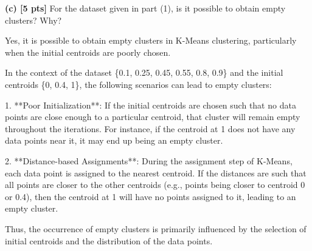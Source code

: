 \textbf{(c) [5 pts]} For the dataset given in part (1), is it possible to obtain empty clusters? Why?

Yes, it is possible to obtain empty clusters in K-Means clustering, particularly when the initial centroids are poorly chosen. 

In the context of the dataset \{0.1, 0.25, 0.45, 0.55, 0.8, 0.9\} and the initial centroids \{0, 0.4, 1\}, the following scenarios can lead to empty clusters:

1. **Poor Initialization**: If the initial centroids are chosen such that no data points are close enough to a particular centroid, that cluster will remain empty throughout the iterations. For instance, if the centroid at 1 does not have any data points near it, it may end up being an empty cluster.

2. **Distance-based Assignments**: During the assignment step of K-Means, each data point is assigned to the nearest centroid. If the distances are such that all points are closer to the other centroids (e.g., points being closer to centroid 0 or 0.4), then the centroid at 1 will have no points assigned to it, leading to an empty cluster.

Thus, the occurrence of empty clusters is primarily influenced by the selection of initial centroids and the distribution of the data points.



